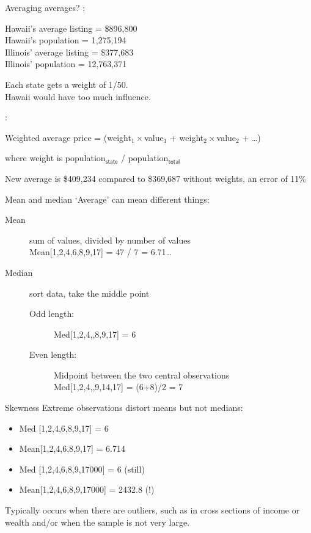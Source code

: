 \documentclass{beamer}
\begin{document}
\begin{frame}{Averaging averages?}
:

Hawaii's average listing = \$896,800\\
Hawaii's population = 1,275,194\\
Illinois' average listing = \$377,683\\
Illinois' population = 12,763,371

\vspace{1em}
Each state gets a weight of 1/50.\\
Hawaii would have too much influence.

\pause
{}:
\begin{block}{Weighted average}
price = (weight$_1 \times $value$_1$ + weight$_2 \times $value$_2$ + \dots)

    where weight is population$_{\textsf{state}}$ / population$_{\textsf{total}}$
\end{block}

\vspace{1em}
New average is \$409,234 compared to \$369,687 without weights,
an error of 11\%
\end{frame}


\begin{frame}{Mean and median}
`Average' can mean different things:
\begin{description}
\item[Mean] sum of values, divided by number of values \\
        Mean[1,2,4,6,8,9,17] = 47 / 7 = 6.71\dots

\item[Median] sort data, take the middle point

    \begin{description}
    \item[Odd length:]
        Med[1,2,4,,8,9,17] = 6

    \item[Even length:]
        Midpoint between the two central observations \\
        Med[1,2,4,,9,14,17] = (6+8)/2 = 7
    \end{description}
\end{description}
\end{frame}

\begin{frame}{Skewness}
Extreme observations distort means but not medians:
\begin{itemize}
\item Med [1,2,4,6,8,9,17] = 6
\item Mean[1,2,4,6,8,9,17] = 6.714
\item Med [1,2,4,6,8,9,17000] = 6 (still)
\item Mean[1,2,4,6,8,9,17000] = 2432.8 (!)
\end{itemize}
Typically occurs when there are outliers,
such as in cross sections of income or wealth
and/or when the sample is not very large.
\end{frame}
\end{document}
